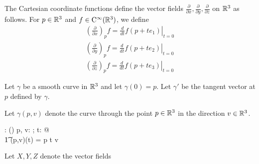 \documentclass[11pt, oneside]{article}
\begin{document}
The Cartesian coordinate functions define the vector fields $\frac{\partial}{\partial x}, \frac{\partial}{\partial y}, \frac{\partial}{\partial z}$
on $\mathbb{R}^3$ as follows. 
For $p \in \mathbb{R}^3$ and $f \in \operatorname{C^{\infty}}(\mathbb{R}^3)$, we define
\begin{align}
\left(\frac{\partial}{\partial x}\right)_p f = \left. \frac{d}{dt} f(p + t e_1) \right|_{t = 0} \\
\left(\frac{\partial}{\partial y}\right)_p f = \left. \frac{d}{dt} f(p + t e_2) \right|_{t = 0} \\
\left(\frac{\partial}{\partial z}\right)_p f = \left. \frac{d}{dt} f(p + t e_3) \right|_{t = 0}
\end{align}

Let $\gamma$ be a smooth curve in $\mathbb{R}^3$ and let $\gamma(0) = p$.
Let $\gamma'$ be the tangent vector at $p$ defined by $\gamma$.

Let $\gamma(p,v)$ denote the curve through the point $p \in \mathbb{R}^3$ in the direction $v \in \mathbb{R}^3$.
\begin{axdef}
	\gamma: \Rthree \cross \Rthree \fun (\R \fun \Rthree)
\where
	\forall p, v: \Rthree; t: \R @ \\
	\t1	\gamma(p,v)(t) = p \vaddR t \smulR v
\end{axdef}

Let $X, Y, Z$ denote the vector fields

\printbibliography
\end{document}
